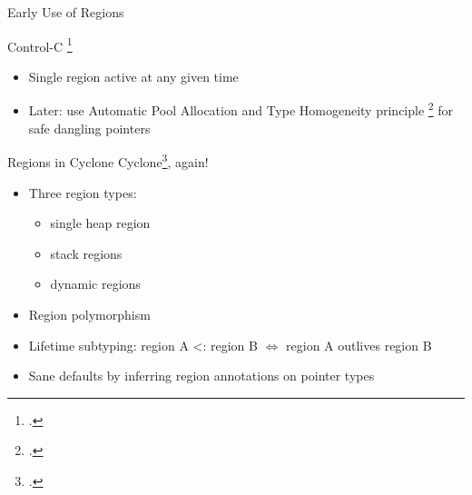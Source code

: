 \documentclass[aspectratio=169]{beamer}
\begin{document}
\begin{frame}{Early Use of Regions}
{Control-C \footcite{kowshik_ensuring_2002}
    \vspace{-0.1in}
    \begin{itemize}
        \item Single region active at any given time
        \item Later: use Automatic Pool Allocation and Type Homogeneity principle \footcite{dhurjati_memory_2003} for safe dangling pointers 
    \end{itemize}
}
    \vspace{0.2in}
\end{frame}

\begin{frame}{Regions in Cyclone}
    Cyclone\footcite{grossman_region-based_2002}, again!
    \begin{itemize}[<+->]
        \item Three region types:
            \begin{itemize}
                \item single \alert{heap} region 
                \item \alert{stack} regions 
                \item \alert{dynamic} regions 
            \end{itemize}
        \item Region polymorphism
        \item Lifetime subtyping: region A <: region B $\Leftrightarrow$ region A \alert{outlives} region B
        \item Sane defaults by inferring region annotations on pointer types  %
    \end{itemize}
    \vspace{0.1in}
\end{frame}
\end{document}
